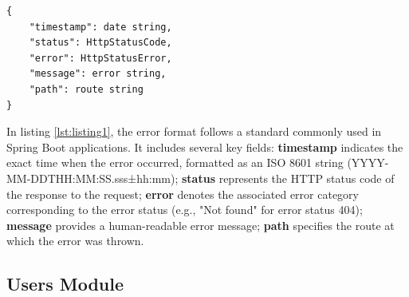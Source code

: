 \begin{lstlisting}[style=json, frame=single, caption={error response format}, label={lst:listing1}]
{
    "timestamp": date string,
    "status": HttpStatusCode,
    "error": HttpStatusError,
    "message": error string,
    "path": route string
}
\end{lstlisting}

\noindent In listing \ref{lst:listing1}, the error format follows a standard commonly used in Spring Boot applications. It includes several key fields: \textbf{timestamp} indicates the exact time when the error occurred, formatted as an ISO 8601 string (YYYY-MM-DDTHH:MM:SS.sss±hh:mm); \textbf{status} represents the HTTP status code of the response to the request; \textbf{error} denotes the associated error category corresponding to the error status (e.g., "Not found" for error status 404); \textbf{message} provides a human-readable error message; \textbf{path} specifies the route at which the error was thrown.

\subsection{Users Module}

